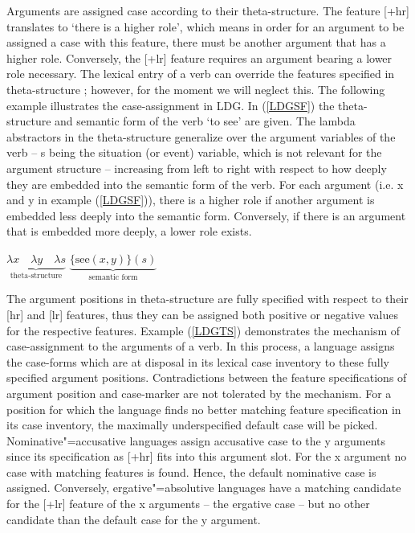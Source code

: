 Arguments are assigned case according to their theta-structure.
The feature [+hr] translates to `there is a higher role', which means in order for an argument to be assigned a case with this feature, there must be another argument that has a higher role. 
Conversely, the [+lr] feature requires an argument bearing a lower role necessary.
The lexical entry of a verb can override the features specified in theta-structure \citep{WunderlichLakaemper:2001}; however, for the moment we will neglect this. 
The following example illustrates the case-assignment in LDG.  In (\ref{LDGSF}) the theta-structure and semantic form of the verb `to see' are given.
The lambda abstractors in the theta-structure generalize over the argument variables of the verb -- {s} being the situation (or event) variable, which is not relevant for the argument structure -- increasing from left to right with respect to how deeply they are embedded into the semantic form of the verb.
For each argument (i.e. {x} and {y} in example (\ref{LDGSF})), there is a higher role if another argument is embedded less deeply into the semantic form. 
Conversely, if there is an argument that is embedded more deeply, a lower role exists.
 
\begin{exe}
\ex\label{LDGSF}
$ \underbrace{ \lambda x \quad \lambda y \quad \lambda s}_{\text{theta-structure}}$ \qquad $ \underbrace{\{ \text{see} (x,y)\} (s)}_{\text{semantic form}} $ 
\end{exe}

The argument positions in theta-structure are fully specified with respect to their [hr] and [lr] features, thus they can be assigned both positive or negative values for the respective features. 
Example (\ref{LDGTS}) demonstrates the mechanism of case-assignment to the arguments of a verb. 
In this process, a language assigns the case-forms  which are at disposal in its lexical case inventory to these fully specified argument positions. 
Contradictions between the feature specifications of argument position and case-marker are not tolerated by the mechanism. 
For a position for which the language finds no better matching feature specification in its case inventory, the maximally underspecified default case will be picked. 
Nominative"=accusative languages assign accusative case to the {y} arguments since its specification as [+hr] fits into this argument slot. 
For the {x} argument no case with matching features is found. 
Hence, the default nominative case is assigned. 
Conversely, ergative"=absolutive languages have a matching candidate for the [+lr] feature of the {x} arguments -- the ergative case -- but no other candidate than the default case for the {y} argument.  

